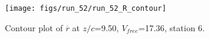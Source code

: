\begin{figure}[H]
\centering
\texttt{[image: figs/run\_52/run\_52\_R\_contour]}
\caption{Contour plot of $\overline{r}$ at $z/c$=9.50, $V_{free}$=17.36, station 6.}
\end{figure}



